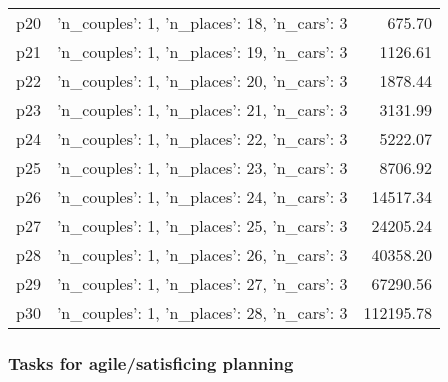 \documentclass{article}
\begin{document}
\begin{center}
\begin{tabular}{@{}l|r|r@{}}
  p20&{'n\_couples': 1, 'n\_places': 18, 'n\_cars': 3}&675.70\\
  p21&{'n\_couples': 1, 'n\_places': 19, 'n\_cars': 3}&1126.61\\
  p22&{'n\_couples': 1, 'n\_places': 20, 'n\_cars': 3}&1878.44\\
  p23&{'n\_couples': 1, 'n\_places': 21, 'n\_cars': 3}&3131.99\\
  p24&{'n\_couples': 1, 'n\_places': 22, 'n\_cars': 3}&5222.07\\
  p25&{'n\_couples': 1, 'n\_places': 23, 'n\_cars': 3}&8706.92\\
  p26&{'n\_couples': 1, 'n\_places': 24, 'n\_cars': 3}&14517.34\\
  p27&{'n\_couples': 1, 'n\_places': 25, 'n\_cars': 3}&24205.24\\
  p28&{'n\_couples': 1, 'n\_places': 26, 'n\_cars': 3}&40358.20\\
  p29&{'n\_couples': 1, 'n\_places': 27, 'n\_cars': 3}&67290.56\\
  p30&{'n\_couples': 1, 'n\_places': 28, 'n\_cars': 3}&112195.78
                            \end{tabular}
                            \end{center}
                    

                                \subsubsection*{Tasks for agile/satisficing planning}
                                
\end{document}
